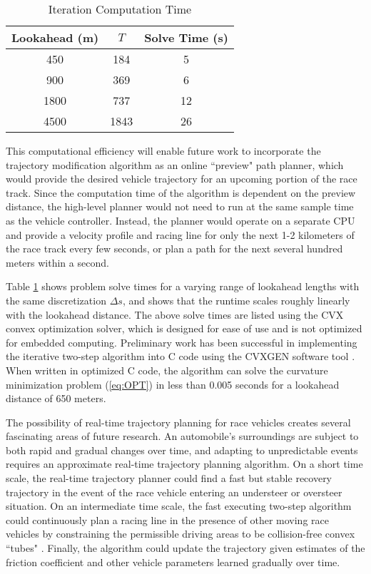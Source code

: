 \begin{table}[h]
\begin{center}
\caption{Iteration Computation Time}\label{tb:solvetime}
\begin{tabular}{ccc}
Lookahead (m) & $T$ & Solve Time (s) \\\hline
450& 184 &5 \\
900&  369 & 6 \\
1800& 737 & 12 \\
4500& 1843& 26 \\\hline
\end{tabular}
\end{center}
\end{table}

This computational efficiency will enable future work to incorporate the trajectory modification algorithm as an online
 ``preview" path planner, which would provide the desired vehicle trajectory for an upcoming portion of the race track. 
 Since the computation time of the algorithm is dependent on the preview distance, 
 the high-level planner would not need to run at the same sample time as the vehicle controller. Instead, the planner would operate on a separate CPU and provide a velocity profile and racing line for only
 the next 1-2 kilometers of the race track every few seconds, or plan a path for the next several hundred meters within a second.
 
 Table \ref{tb:solvetime} shows problem solve times for a varying range of lookahead lengths with the same discretization $\Delta s$,
 and shows that the runtime scales roughly linearly with the lookahead distance. The above solve times are listed using the CVX convex optimization solver, which 
 is designed for ease of use and is not optimized for embedded computing. Preliminary work has been successful
 in implementing the iterative two-step algorithm into C code using the CVXGEN software tool \cite{boydcvxgen}. When written
 in optimized C code, the algorithm can solve the curvature minimization problem (\ref{eq:OPT}) in less than 0.005 seconds for a lookahead distance of 650 meters.
 
 The possibility of real-time trajectory planning for race vehicles creates several fascinating areas of future research. An automobile's surroundings are subject to both rapid and
 gradual changes over time, and adapting to unpredictable events requires an approximate real-time trajectory planning algorithm.
 On a short time scale, the real-time trajectory planner could find a fast but stable recovery trajectory in the event of the race vehicle entering an understeer or oversteer 
 situation. On an intermediate time scale, the fast executing two-step algorithm could continuously plan a racing line in the presence of other moving race vehicles by constraining the
 permissible driving areas to be collision-free convex ``tubes" \cite{erlien}.  Finally, the algorithm could update the trajectory given estimates of the friction coefficient and other vehicle parameters learned gradually over
 time.
 
